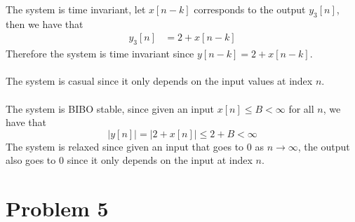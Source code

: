 The system is time invariant, let $x[n-k]$ corresponds to the output $y_3[n]$, then we have that
\begin{align*}
    y_3[n]&=2+x[n-k]
\end{align*}
Therefore the system is time invariant since $y[n-k]=2+x[n-k]$.\\\\
The system is casual since it only depends on the input values at index $n$.\\\\
The system is BIBO stable, since given an input $x[n]\leq B<\infty$ for all $n$, we have that
$$|y[n]|=|2+x[n]|\leq 2+B < \infty$$
The system is relaxed since given an input that goes to $0$ as $n\to\infty$, the output
also goes to $0$ since it only depends on the input at index $n$.
\section*{Problem 5}

